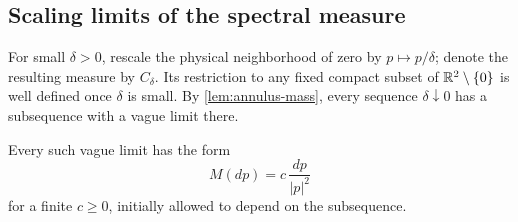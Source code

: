 \subsection{Scaling limits of the spectral measure}

For small \(\delta>0\), rescale the physical neighborhood of zero by
\(p\mapsto p/\delta\); denote the resulting measure by \(C_\delta\).
Its restriction to any fixed compact subset of \(\mathbb R^2\setminus\{0\}\) is
well defined once \(\delta\) is small. By \cref{lem:annulus-mass}, every
sequence \(\delta\downarrow0\) has a subsequence with a vague limit there.

\begin{lemma}
\label{lem:spectral-subsequences}
Every such vague limit has the form
\begin{equation}
 \label{eq:spectral-subsequence}
 M(dp)=c\,\frac{dp}{|p|^2}
\end{equation}
for a finite \(c\ge0\), initially allowed to depend on the subsequence.
\end{lemma}

